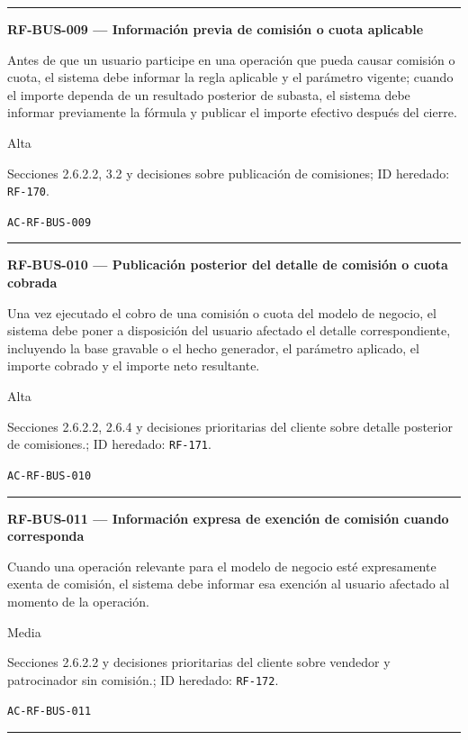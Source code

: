 \documentclass[10pt,letterpaper]{article}
\begin{document}
\vspace{0.25em}\hrule\vspace{0.65em}
\noindent\textbf{RF-BUS-009 --- Información previa de comisión o cuota aplicable}\par
\begin{description}[style=nextline,leftmargin=3.15cm,labelwidth=2.8cm,font=\normalfont\bfseries]
\item[Obligación] Antes de que un usuario participe en una operación que pueda causar comisión o cuota, el sistema debe informar la regla aplicable y el parámetro vigente; cuando el importe dependa de un resultado posterior de subasta, el sistema debe informar previamente la fórmula y publicar el importe efectivo después del cierre.
\item[Prioridad] Alta
\item[Procedencia] Secciones 2.6.2.2, 3.2 y decisiones sobre publicación de comisiones; ID heredado: \texttt{RF-170}.
\item[Verificación] \texttt{AC-RF-BUS-009}
\end{description}
\vspace{0.25em}\hrule\vspace{0.65em}
\noindent\textbf{RF-BUS-010 --- Publicación posterior del detalle de comisión o cuota cobrada}\par
\begin{description}[style=nextline,leftmargin=3.15cm,labelwidth=2.8cm,font=\normalfont\bfseries]
\item[Obligación] Una vez ejecutado el cobro de una comisión o cuota del modelo de negocio, el sistema debe poner a disposición del usuario afectado el detalle correspondiente, incluyendo la base gravable o el hecho generador, el parámetro aplicado, el importe cobrado y el importe neto resultante.
\item[Prioridad] Alta
\item[Procedencia] Secciones 2.6.2.2, 2.6.4 y decisiones prioritarias del cliente sobre detalle posterior de comisiones.; ID heredado: \texttt{RF-171}.
\item[Verificación] \texttt{AC-RF-BUS-010}
\end{description}
\vspace{0.25em}\hrule\vspace{0.65em}
\noindent\textbf{RF-BUS-011 --- Información expresa de exención de comisión cuando corresponda}\par
\begin{description}[style=nextline,leftmargin=3.15cm,labelwidth=2.8cm,font=\normalfont\bfseries]
\item[Obligación] Cuando una operación relevante para el modelo de negocio esté expresamente exenta de comisión, el sistema debe informar esa exención al usuario afectado al momento de la operación.
\item[Prioridad] Media
\item[Procedencia] Secciones 2.6.2.2 y decisiones prioritarias del cliente sobre vendedor y patrocinador sin comisión.; ID heredado: \texttt{RF-172}.
\item[Verificación] \texttt{AC-RF-BUS-011}
\end{description}
\vspace{0.25em}\hrule\vspace{0.65em}
\end{document}
